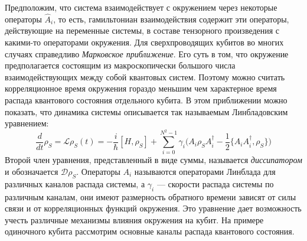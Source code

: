 Предположим, что система взаимодействует с окружением через некоторые операторы $\hat{A}_i$, то есть, гамильтониан взаимодействия содержит эти операторы, действующие на переменные системы, в составе тензорного произведения с какими-то операторами окружения. Для сверхпроводящих кубитов во многих случаях справедливо \textit{Марковское приближение}. Его суть в том, что окружение предполагается состоящим из макроскопически большого числа  взаимодействующих между собой квантовых систем. Поэтому можно считать корреляционное время окружения гораздо меньшим чем характерное время распада квантового состояния отдельного кубита. В этом приближении можно показать, что динамика системы описывается так называемым Линбладовским уравнением:
\begin{equation}
\frac{d}{dt}\rho_S = \mathcal{L}\rho_S(t) = -\frac{i}{\hbar}[H, \rho_S] + \sum_{i=0}^{N^2-1}\gamma_i\big( A_i\rho_SA^\dag_i -\frac{1}{2}\{ A_iA^\dagger_i, \rho_S\}\big)
\label{eq: Master_L}
\end{equation}
Второй член уравнения, представленный в виде суммы, называется \textit{диссипатором} и обозначается $\mathcal{D}\rho_S$. Операторы $A_i$ называются операторами Линблада для различных каналов распада системы, а $\gamma_i$ --- скорости распада системы по различным каналам, они имеют размерность обратного времени зависят от силы связи и от корреляционных функций окружения. Это уравнение дает возможность учесть различные механизмы влияния окружения на кубит. На примере одиночного кубита рассмотрим основные каналы распада квантового состояния. 

